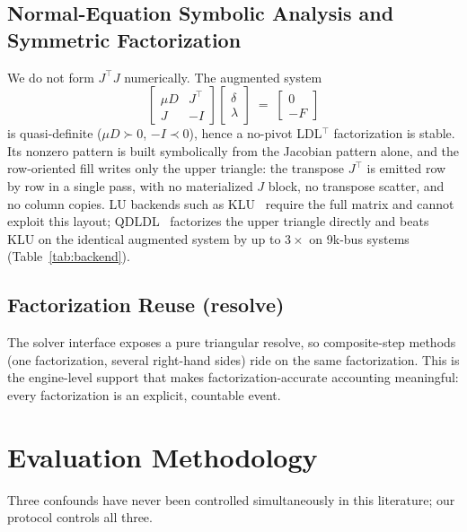 \documentclass[11pt]{article}
\begin{document}
\subsection{Normal-Equation Symbolic Analysis and Symmetric Factorization}

We do not form $J^{\top}J$ numerically. The augmented system
\begin{equation}
  \begin{bmatrix} \mu D & J^{\top} \\ J & -I \end{bmatrix}
  \begin{bmatrix} \delta \\ \lambda \end{bmatrix}
  \;=\;
  \begin{bmatrix} 0 \\ -F \end{bmatrix}
  \label{eq:augmented}
\end{equation}
is quasi-definite ($\mu D \succ 0$, $-I \prec 0$), hence a no-pivot
LDL$^{\top}$ factorization is stable. Its nonzero pattern is built
symbolically from the Jacobian pattern alone, and the row-oriented fill
writes only the upper triangle: the transpose $J^{\top}$ is emitted row by
row in a single pass, with no materialized $J$ block, no transpose scatter,
and no column copies. LU backends such as KLU~\cite{klu2010} require the
full matrix and cannot exploit this layout; QDLDL~\cite{qdldl} factorizes
the upper triangle directly and beats KLU on the identical augmented
system by up to $3\times$ on 9k-bus systems
(Table~\ref{tab:backend}).

\subsection{Factorization Reuse (resolve)}

The solver interface exposes a pure triangular resolve, so composite-step
methods (one factorization, several right-hand sides) ride on the same
factorization. This is the engine-level support that makes
factorization-accurate accounting meaningful: every factorization is an
explicit, countable event.

\section{Evaluation Methodology}

Three confounds have never been controlled simultaneously in this
literature; our protocol controls all three.
\end{document}
